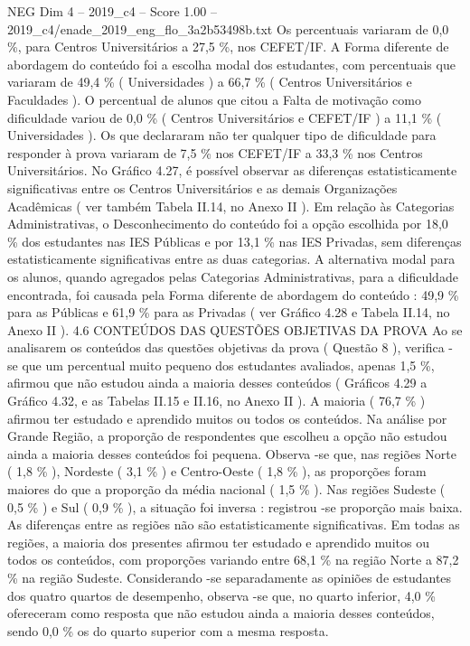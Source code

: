 \begin{textsample}{NEG Dim 4 – 2019\_c4 – Score 1.00 – 2019\_c4/enade\_2019\_eng\_flo\_3a2b53498b.txt}
Os percentuais variaram de 0,0 \%, para Centros Universitários a 27,5 \%, nos CEFET/IF.
A Forma diferente de abordagem do conteúdo foi a escolha modal dos estudantes, com percentuais que variaram de 49,4 \% ( Universidades ) a 66,7 \% ( Centros Universitários e Faculdades ).
O percentual de alunos que citou a Falta de motivação como dificuldade variou de 0,0 \% ( Centros Universitários e CEFET/IF ) a 11,1 \% ( Universidades ).
Os que declararam não ter qualquer tipo de dificuldade para responder à prova variaram de 7,5 \% nos CEFET/IF a 33,3 \% nos Centros Universitários.
No Gráfico 4.27, é possível observar as diferenças estatisticamente significativas entre os Centros Universitários e as demais Organizações Acadêmicas ( ver também Tabela II.14, no Anexo II ).
Em relação às Categorias Administrativas, o Desconhecimento do conteúdo foi a opção escolhida por 18,0 \% dos estudantes nas IES Públicas e por 13,1 \% nas IES Privadas, sem diferenças estatisticamente significativas entre as duas categorias.
A alternativa modal para os alunos, quando agregados pelas Categorias Administrativas, para a dificuldade encontrada, foi causada pela Forma diferente de abordagem do conteúdo : 49,9 \% para as Públicas e 61,9 \% para as Privadas ( ver Gráfico 4.28 e Tabela II.14, no Anexo II ). 4.6 CONTEÚDOS DAS QUESTÕES OBJETIVAS DA PROVA Ao se analisarem os conteúdos das questões objetivas da prova ( Questão 8 ), verifica -se que um percentual muito pequeno dos estudantes avaliados, apenas 1,5 \%, afirmou que não estudou ainda a maioria desses conteúdos ( Gráficos 4.29 a Gráfico 4.32, e as Tabelas II.15 e II.16, no Anexo II ).
A maioria ( 76,7 \% ) afirmou ter estudado e aprendido muitos ou todos os conteúdos.
Na análise por Grande Região, a proporção de respondentes que escolheu a opção não estudou ainda a maioria desses conteúdos foi pequena.
Observa -se que, nas regiões Norte ( 1,8 \% ), Nordeste ( 3,1 \% ) e Centro-Oeste ( 1,8 \% ), as proporções foram maiores do que a proporção da média nacional ( 1,5 \% ).
Nas regiões Sudeste ( 0,5 \% ) e Sul ( 0,9 \% ), a situação foi inversa : registrou -se proporção mais baixa.
As diferenças entre as regiões não são estatisticamente significativas.
Em todas as regiões, a maioria dos presentes afirmou ter estudado e aprendido muitos ou todos os conteúdos, com proporções variando entre 68,1 \% na região Norte a 87,2 \% na região Sudeste.
Considerando -se separadamente as opiniões de estudantes dos quatro quartos de desempenho, observa -se que, no quarto inferior, 4,0 \% ofereceram como resposta que não estudou ainda a maioria desses conteúdos, sendo 0,0 \% os do quarto superior com a mesma resposta.

\end{textsample}
